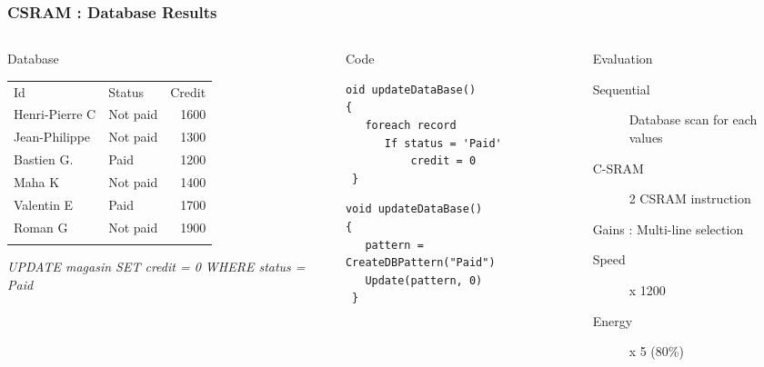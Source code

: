\begin{frame}[fragile]\frametitle{CSRAM : Database Results}
\begin{columns}[t]
  \begin{column}{3cm}
    \begin{block}{Database}\tiny
      \begin{tabular}{l l r}
        Id & Status & Credit \\
        Henri-Pierre C & Not paid & 1600\\
        Jean-Philippe  & Not paid & 1300\\
        Bastien G. & Paid & 1200\\
        Maha K & Not paid & 1400\\
        Valentin E & Paid& 1700\\ 
        Roman G     & Not paid& 1900\\ \\
      \end{tabular}

\textit{UPDATE magasin SET credit = 0 WHERE status = Paid}
    \end{block}
  \end{column}

  \begin{column}{5cm}
    \begin{block}{Code}
      \begin{lstlisting}
oid updateDataBase()
{
   foreach record
      If status = 'Paid'
          credit = 0
 }        
      \end{lstlisting}
      \begin{lstlisting}
void updateDataBase()
{
   pattern = CreateDBPattern("Paid")
   Update(pattern, 0)
 }
      \end{lstlisting}
    \end{block}
  \end{column}
  
  \begin{column}{5cm}
    \begin{block}{Evaluation}
      \begin{description}
      \item[Sequential] Database scan for each values
      \item[C-SRAM] 2 CSRAM instruction
      \end{description}
   \end{block}
    \begin{alertblock}{Gains : Multi-line selection}
      \begin{description}
      \item[Speed] x 1200
      \item[Energy] x 5 (80\%)
      \end{description}
    \end{alertblock}
  \end{column}
\end{columns}
\end{frame}

